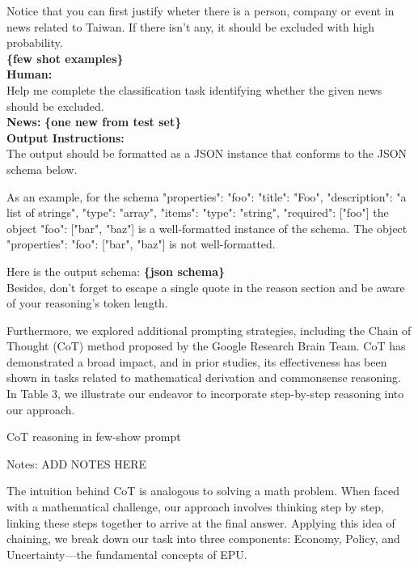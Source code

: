 \documentclass[11pt,english]{report}
\begin{document}
\noindent Notice that you can first justify wheter there is a person, company
or event in news related to Taiwan. If there isn't any, it should be excluded
with high probability. \\

\noindent \textbf{\{few shot examples\}} \\

\noindent \textbf{Human:} \\
Help me complete the classification task identifying whether the given news
should be excluded. \\
\noindent \textbf{News:} \textbf{\{one new from test set\}} \\

\noindent \textbf{Output Instructions:} \\
The output should be formatted as a JSON instance that conforms to the JSON
schema below.

\noindent As an example, for the schema {"properties": {"foo": {"title": "Foo", "description": "a list of strings", "type": "array", "items": {"type": "string"}}}, "required": ["foo"]}
the object {"foo": ["bar", "baz"]} is a well-formatted instance of the schema. The object {"properties": {"foo": ["bar", "baz"]}} is not well-formatted.

\noindent Here is the output schema:
\textbf{\{json schema\}} \\
Besides, don't forget to escape a single quote in the reason section and be
aware of your reasoning's token length.
\newpage

Furthermore, we explored additional prompting strategies, including the Chain
of Thought (CoT) method proposed by the Google Research Brain Team. CoT has
demonstrated a broad impact, and in prior studies, its effectiveness has been
shown in tasks related to mathematical derivation and commonsense reasoning.
In Table 3, we illustrate our endeavor to incorporate step-by-step reasoning
into our approach.
\vspace{.3cm}
\begin{table}[H]
\renewcommand\arraystretch{1.5}
\caption{CoT reasoning in few-show prompt} 
\label{tab: PayDexMin DID}
\begin{adjustwidth}{-0.0cm}{}
\begin{center}
\setlength{\tabcolsep}{8pt}
{\fontsize{8}{12} \selectfont 
     
}
\end{center}
\end{adjustwidth}
\footnotesize{
\begin{justify}
Notes: ADD NOTES HERE
\end{justify}
}
\end{table}
\newpage
The intuition behind CoT is analogous to solving a math problem. When faced
with a mathematical challenge, our approach involves thinking step by step,
linking these steps together to arrive at the final answer. Applying this idea
of chaining, we break down our task into three components: Economy, Policy, and
Uncertainty—the fundamental concepts of EPU.
\end{document}
